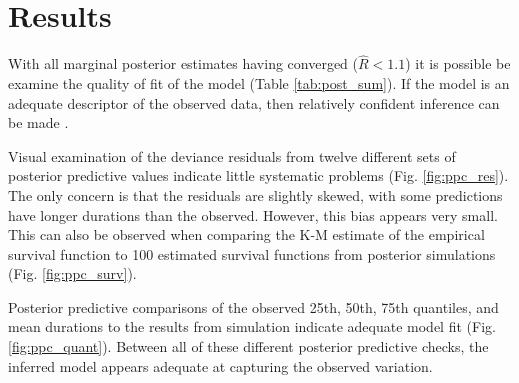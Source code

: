 \documentclass[12pt,letterpaper]{article}
\begin{document}
\section{Results}

With all marginal posterior estimates having converged (\(\hat{R} < 1.1\)) it is possible be examine the quality of fit of the model (Table \ref{tab:post_sum}). If the model is an adequate descriptor of the observed data, then relatively confident inference can be made \citep{Gelman2013d}.

Visual examination of the deviance residuals from twelve different sets of posterior predictive values indicate little systematic problems (Fig. \ref{fig:ppc_res}). The only concern is that the residuals are slightly skewed, with some predictions have longer durations than the observed. However, this bias appears very small. This can also be observed when comparing the K-M estimate of the empirical survival function to 100 estimated survival functions from posterior simulations (Fig. \ref{fig:ppc_surv}).

Posterior predictive comparisons of the observed 25th, 50th, 75th quantiles, and mean durations to the results from simulation indicate adequate model fit (Fig. \ref{fig:ppc_quant}). Between all of these different posterior predictive checks, the inferred model appears adequate at capturing the observed variation.

\end{document}
